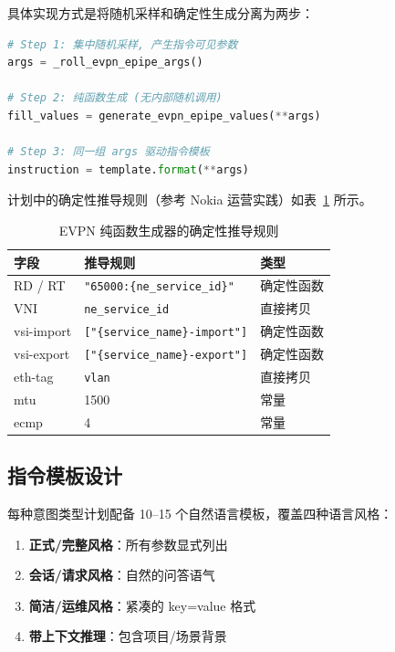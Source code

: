 \documentclass[12pt, a4paper]{article}
\begin{document}
具体实现方式是将随机采样和确定性生成分离为两步：

\begin{lstlisting}[language=Python, caption={纯函数生成器的两步分离}]
# Step 1: 集中随机采样, 产生指令可见参数
args = _roll_evpn_epipe_args()

# Step 2: 纯函数生成 (无内部随机调用)
fill_values = generate_evpn_epipe_values(**args)

# Step 3: 同一组 args 驱动指令模板
instruction = template.format(**args)
\end{lstlisting}

\noindent
计划中的确定性推导规则（参考 Nokia 运营实践）如表~\ref{tab:deterministic-rules} 所示。

\begin{table}[H]
\centering
\caption{EVPN 纯函数生成器的确定性推导规则}
\label{tab:deterministic-rules}
\small
\begin{tabular}{lll}
\toprule
\textbf{字段} & \textbf{推导规则} & \textbf{类型} \\
\midrule
RD / RT            & \texttt{"65000:\{ne\_service\_id\}"} & 确定性函数 \\
VNI                & \texttt{ne\_service\_id}             & 直接拷贝 \\
vsi-import         & \texttt{["\{service\_name\}-import"]} & 确定性函数 \\
vsi-export         & \texttt{["\{service\_name\}-export"]} & 确定性函数 \\
eth-tag            & \texttt{vlan}                        & 直接拷贝 \\
mtu                & 1500                                  & 常量 \\
ecmp               & 4                                     & 常量 \\
\bottomrule
\end{tabular}
\end{table}

\subsection{指令模板设计}

每种意图类型计划配备 10--15 个自然语言模板，覆盖四种语言风格：

\begin{enumerate}
  \item \textbf{正式/完整风格}：所有参数显式列出
  \item \textbf{会话/请求风格}：自然的问答语气
  \item \textbf{简洁/运维风格}：紧凑的 key=value 格式
  \item \textbf{带上下文推理}：包含项目/场景背景
\end{enumerate}
\end{document}
